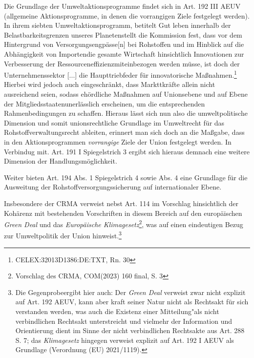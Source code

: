 \documentclass[12pt,a4paper,oneside]{book} %
\begin{document}
Die Grundlage der Umweltaktionsprogramme findet sich in Art. 192 III AEUV (\glqq allgemeine Aktionsprogramme, in denen die vorrangigen Ziele festgelegt werden\grqq).
In ihrem siebten Umweltaktionsprogramm, betitelt \glqq Gut leben innerhalb der Belastbarkeitsgrenzen unseres Planeten\grqq stellt die Kommission fest, dass vor dem Hintergrund von \glqq Versorgungsengpässe[n] bei Rohstoffen und im Hinblick auf die Abhängigkeit von Importen\grqq die gesamte Wirtschaft hinsichtlich \glqq Innovationen zur Verbesserung der Ressourceneffizienz\glqq miteinbezogen werden müsse, ist doch der \glqq Unternehmenssektor [...] die Haupttriebfeder für innovatorische Maßnahmen\grqq.\footnote{CELEX:32013D1386:DE:TXT, Rn. 30} Hierbei wird jedoch auch eingeschränkt, dass Markttkräfte allein nicht ausreichend seien, sodass \glqq [b]ehördliche Maßnahmen auf Unionsebene und auf Ebene der Mitgliedsstaaten\grqq unerlässlich erscheinen, um die entsprechenden Rahmenbedingungen zu schaffen. Hieraus lässt sich nun also die umweltpolitische Dimension und somit unionsrechtliche Grundlage im Umweltrecht für das Rohstoffverwaltungsrecht ableiten, erinnert man sich doch an die Maßgabe, dass in den Aktionsprogrammen \textit{vorrangige} Ziele der Union festgelegt werden. In Verbindug mit. Art. 191 I Spiegelstrich 3 ergibt sich hieraus demnach eine weitere Dimension der Handlungsmöglichkeit.

Weiter bieten Art. 194 Abs. 1 Spiegelstrich 4 sowie Abs. 4 eine Grundlage für die Ausweitung der Rohstoffversorgungssicherung auf internationaler Ebene.\autocite{Frez 2025, S. 1035}
	
	
	
Insbesondere der CRMA verweist nebst Art. 114 im Vorschlag hinsichtlich der Kohärenz mit bestehenden Vorschriften in diesem Bereich auf den europäischen \textit{Green Deal} und das \textit{Europäische Klimagesetz}\footnote{Vorschlag des CRMA, COM(2023) 160 final, S. 3}, was auf einen eindeutigen Bezug zur Umweltpolitik der Union hinweist.\footnote{Die \glqq Gegenprobe\grqq ergibt hier auch: Der \textit{Green Deal} verweist zwar nicht explizit auf Art. 192 AEUV, kann aber kraft seiner Natur nicht als Rechtsakt für sich verstanden werden, was auch die Existenz einer \glqq Mitteilung"\grqq als nicht verbindlichen Rechtsakt unterstreicht und vielmehr der Information und Orientierung dient im Sinne der nicht verbindlichen Rechtsakte aus Art. 288 S. 7; das \textit{Klimagesetz} hingegen verweist explizit auf Art. 192 I AEUV als Grundlage (Verordnung (EU) 2021/1119).}
	
\end{document}
